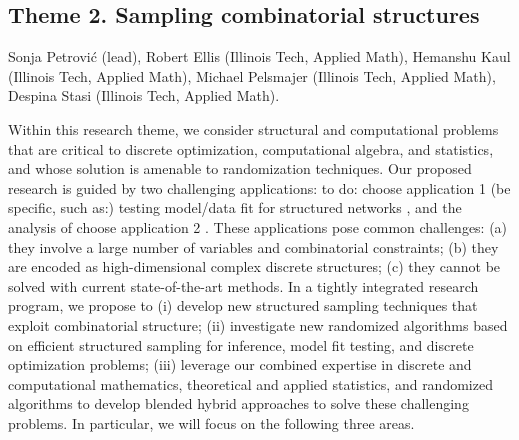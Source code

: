 \documentclass[11pt]{NSFamsart}
\begin{document}
\subsection*{Theme 2. Sampling combinatorial structures} 
 Sonja Petrovi\'c (lead), 
 Robert Ellis (Illinois Tech, Applied Math), 
 Hemanshu Kaul (Illinois Tech, Applied Math), 
 Michael Pelsmajer (Illinois Tech, Applied Math), 
 Despina Stasi (Illinois Tech, Applied Math). 

Within this research theme, we consider structural and computational problems that are critical to discrete optimization, computational algebra, and statistics, and whose solution is amenable to randomization techniques. Our proposed research is guided by two challenging applications: {\color{magenta}to do:} 
choose application 1 (be specific, such as:) testing model/data fit for structured networks \cite{}, and the analysis of choose application 2 \cite{}.  
These applications pose common challenges: (a) they involve a large number of variables and combinatorial constraints; (b) they are encoded as high-dimensional complex discrete structures; (c) they cannot be solved with current state-of-the-art methods. 
In a tightly integrated research program, we propose to (i) develop new structured sampling techniques that exploit combinatorial structure; (ii) investigate new randomized algorithms based on efficient structured sampling for  inference, model fit testing, and discrete optimization problems; (iii) leverage our combined expertise in discrete and computational mathematics, theoretical and applied statistics, and randomized algorithms to develop  blended hybrid approaches to solve these challenging problems. 
In particular, we will focus on the following three areas. 
\end{document}
